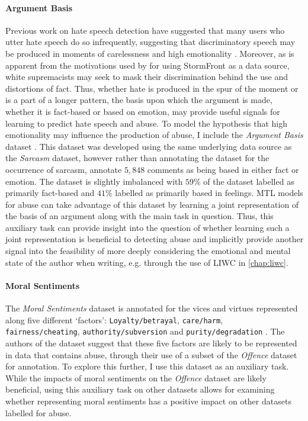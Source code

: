 \paragraph{Argument Basis}
Previous work on hate speech detection have suggested that many users who utter hate speech do so infrequently, suggesting that discriminatory speech may be produced in moments of carelessness and high emotionality \citep{Waseem:2016}. 
Moreover, as is apparent from the motivations used by \citet{Garcia:2019} for using StormFront as a data source, white supremacists may seek to mask their discrimination behind the use and distortions of fact.
Thus, whether hate is produced in the spur of the moment or is a part of a longer pattern, the basis upon which the argument is made, whether it is fact-based or based on emotion, may provide useful signals for learning to predict hate speech and abuse.
To model the hypothesis that high emotionality may influence the production of abuse, I include the \textit{Argument Basis} dataset \citep{Oraby_factfeel:2015}.
This dataset was developed using the same underlying data source as the \textit{Sarcasm} dataset, however rather than annotating the dataset for the occurrence of sarcasm, \citet{Oraby_factfeel:2015} annotate $5,848$ comments as being based in either fact or emotion.
The dataset is slightly imbalanced with $59\%$ of the dataset labelled as primarily fact-based and $41\%$ labelled as primarily based in feelings.
MTL models for abuse can take advantage of this dataset by learning a joint representation of the basis of an argument along with the main task in question.
Thus, this auxiliary task can provide insight into the question of whether learning such a joint representation is beneficial to detecting abuse and implicitly provide another signal into the feasibility of more deeply considering the emotional and mental state of the author when writing, e.g. through the use of LIWC in \cref{chap:liwc}.

\paragraph{Moral Sentiments}
The \textit{Moral Sentiments} dataset is annotated for the vices and virtues represented along five different `factors': \texttt{Loyalty/betrayal}, \texttt{care/harm},\\ \texttt{fairness/cheating}, \texttt{authority/subversion} and \texttt{purity/degradation} \citep{Hoover:2019}.
The authors of the dataset suggest that these five factors are likely to be represented in data that contains abuse, through their use of a subset of the \textit{Offence} dataset for annotation.
To explore this further, I use this dataset as an auxiliary task.
While the impacts of moral sentiments on the \textit{Offence} dataset are likely beneficial, using this auxiliary task on other datasets allows for examining whether representing moral sentiments has a positive impact on other datasets labelled for abuse.

